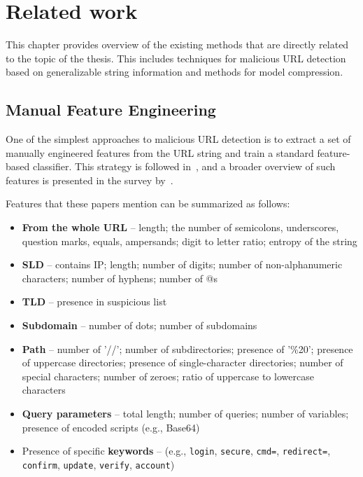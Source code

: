 \chapter{Related work}
\label{sec:related_work}
This chapter provides overview of the existing methods that are directly related to the topic of the thesis. This includes techniques for malicious URL detection based on generalizable string information and methods for model compression.

\section{Manual Feature Engineering}
\label{sec:man_feat_eng}
One of the simplest approaches to malicious URL detection is to extract a set of manually engineered features from the URL string and train a standard feature-based classifier. This strategy is followed in~\cite{lexicalFeaturesModels}, and a broader overview of such features is presented in the survey by~\cite{surveymaliciousfeatures}.

Features that these papers mention can be summarized as follows:
\begin{itemize}
    \item \textbf{From the whole URL} -- length; the number of semicolons, underscores, question marks, equals, ampersands; digit to letter ratio; entropy of the string
    \item \textbf{SLD} -- contains IP; length; number of digits; number of non-alphanumeric characters; number of hyphens; number of @s
    \item \textbf{TLD} -- presence in suspicious list
    \item \textbf{Subdomain} -- number of dots; number of subdomains
    \item \textbf{Path} -- number of '//'; number of subdirectories; presence of '\%20'; presence of uppercase directories; presence of single-character directories; number of special characters; number of zeroes; ratio of uppercase to lowercase characters
    \item \textbf{Query parameters} -- total length; number of queries; number of variables; presence of encoded scripts (e.g., Base64)
    \item Presence of specific \textbf{keywords} -- (e.g., \texttt{login}, \texttt{secure}, \texttt{cmd=}, \texttt{redirect=}, \texttt{confirm}, \texttt{update}, \texttt{verify}, \texttt{account})
\end{itemize}

